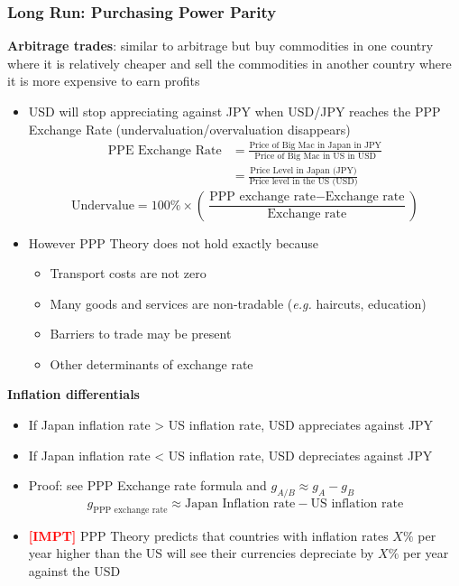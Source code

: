 \documentclass{article}
\newcommand{\eg}[0]{\textit{e.g. }}
\newcommand{\impt}[0]{\textcolor{red}{\textbf{[IMPT] }}}
\begin{document}
\begin{multicols}{2}
\subsubsection{Long Run: Purchasing Power Parity}
\textbf{Arbitrage trades}: similar to arbitrage but buy commodities in one country where it is relatively cheaper and sell the commodities in another country where it is more expensive to earn profits
\begin{itemize}
	\item USD will stop appreciating against JPY when USD/JPY reaches the PPP Exchange Rate (undervaluation/overvaluation disappears)
	\begin{equation*}
		\begin{aligned}
\text{PPE Exchange Rate} &= \frac{\text{Price of Big Mac in Japan in JPY}}{\text{Price of Big Mac in US in USD}}\\
&= \frac{\text{Price Level in Japan (JPY)}}{\text{Price level in the US (USD)}}
		\end{aligned}
	\end{equation*}
$$\text{Undervalue} = 100\%\times\left(\frac{\text{PPP exchange rate} - \text{Exchange rate}}{\text{Exchange rate}}\right)$$
    \item However PPP Theory does not hold exactly because
    \begin{itemize}
    	\item Transport costs are not zero
    	\item Many goods and services are non-tradable (\eg haircuts, education)
    	\item Barriers to trade may be present
    	\item Other determinants of exchange rate
    \end{itemize}
\end{itemize}
\textbf{Inflation differentials}\begin{itemize}
	\item If Japan inflation rate > US inflation rate, USD appreciates against JPY
	\item If Japan inflation rate < US inflation rate, USD depreciates against JPY
	\item Proof: see PPP Exchange rate formula and $g_{A/B} \approx g_A-g_B$
	$$g_{\text{PPP exchange rate}} \approx \text{Japan Inflation rate} - \text{US inflation rate}$$
	\item \impt PPP Theory predicts that countries with inflation rates $X\%$ per year higher than the US will see their currencies depreciate by $X\%$ per year against the USD
\end{itemize}

\end{multicols}
\end{document}

